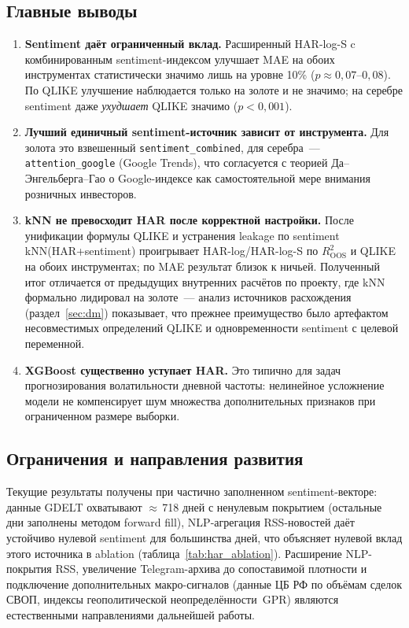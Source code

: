 \subsection{Главные выводы}

\begin{enumerate}
    \item \textbf{Sentiment даёт ограниченный вклад.}
          Расширенный HAR-log-S c комбинированным sentiment-индексом
          улучшает MAE на обоих инструментах статистически значимо
          лишь на уровне 10\% ($p \approx 0{,}07$--$0{,}08$).
          По QLIKE улучшение наблюдается только на золоте и не значимо;
          на серебре sentiment даже \textit{ухудшает} QLIKE значимо ($p < 0{,}001$).
    \item \textbf{Лучший единичный sentiment-источник зависит от инструмента.}
          Для золота это взвешенный \texttt{sentiment\_combined},
          для серебра~--- \texttt{attention\_google} (Google Trends),
          что согласуется с теорией Да--Энгельберга--Гао о Google-индексе
          как самостоятельной мере внимания розничных инвесторов.
    \item \textbf{kNN не превосходит HAR после корректной настройки.}
          После унификации формулы QLIKE и устранения leakage по sentiment
          kNN(HAR+sentiment) проигрывает HAR-log/HAR-log-S по
          $R^2_{\mathrm{OOS}}$ и QLIKE на обоих инструментах;
          по MAE результат близок к ничьей.
          Полученный итог отличается от предыдущих внутренних расчётов
          по проекту, где kNN формально лидировал на золоте~---
          анализ источников расхождения (раздел~\ref{sec:dm}) показывает,
          что прежнее преимущество было артефактом несовместимых
          определений QLIKE и одновременности sentiment с целевой
          переменной.
    \item \textbf{XGBoost существенно уступает HAR.}
          Это типично для задач прогнозирования волатильности
          дневной частоты: нелинейное усложнение модели
          не компенсирует шум множества дополнительных признаков
          при ограниченном размере выборки.
\end{enumerate}

\subsection{Ограничения и направления развития}

Текущие результаты получены при частично заполненном sentiment-векторе:
данные GDELT охватывают $\approx$\,718 дней с ненулевым покрытием
(остальные дни заполнены методом forward fill),
NLP-агрегация RSS-новостей даёт устойчиво нулевой sentiment для
большинства дней, что объясняет нулевой вклад этого источника в ablation
(таблица~\ref{tab:har_ablation}).
Расширение NLP-покрытия RSS, увеличение Telegram-архива
до сопоставимой плотности и подключение дополнительных макро-сигналов
(данные ЦБ РФ по объёмам сделок СВОП, индексы геополитической
неопределённости~GPR) являются естественными направлениями
дальнейшей работы.

